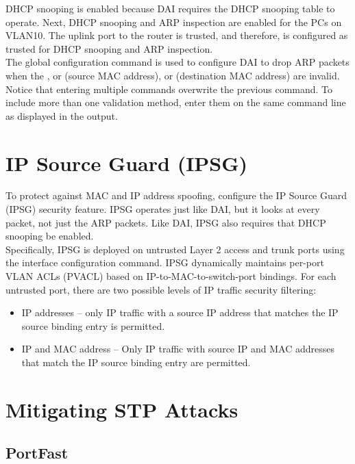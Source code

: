 DHCP snooping is enabled because DAI requires the DHCP snooping table to operate. Next, DHCP snooping and ARP inspection are enabled for the PCs on VLAN10. The uplink port to the router is trusted, and therefore, is configured as trusted for DHCP snooping and ARP inspection.\\

The  global configuration command is used to configure DAI to drop ARP packets when the , or  (source MAC address), or  (destination MAC address) are invalid. Notice that entering multiple  commands overwrite the previous command. To include more than one validation method, enter them on the same command line as displayed in the output.

\section{IP Source Guard (IPSG)}

To protect against MAC and IP address spoofing, configure the IP Source Guard (IPSG) security feature. IPSG operates just like DAI, but it looks at every packet, not just the ARP packets. Like DAI, IPSG also requires that DHCP snooping be enabled.\\

Specifically, IPSG is deployed on untrusted Layer 2 access and trunk ports using the  interface configuration command. IPSG dynamically maintains per-port VLAN ACLs (PVACL) based on IP-to-MAC-to-switch-port bindings. For each untrusted port, there are two possible levels of IP traffic security filtering:

\begin{itemize}
\item IP addresses -- only IP traffic with a source IP address that matches the IP source binding entry is permitted. 
\item IP and MAC address -- Only IP traffic with source IP and MAC addresses that match the IP source binding entry are permitted.
\end{itemize}

\section{Mitigating STP Attacks}

\subsection{PortFast}

